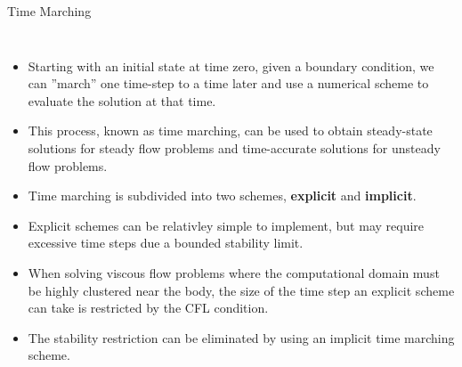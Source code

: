 \begin{frame}{Time Marching}
  \begin{columns}
    \begin{itemize}
      \item Starting with an initial state at time zero, given a boundary condition, we can 
            ”march” one time-step to a time later and use a numerical scheme to evaluate the 
            solution at that time.
      \item This process, known as time marching, can be used to obtain steady-state solutions 
            for steady flow problems and time-accurate solutions for unsteady flow problems.
      \item Time marching is subdivided into two schemes, \textbf{explicit} and \textbf{implicit}.
      \item Explicit schemes can be relativley simple to implement, but may require excessive 
            time steps due a bounded stability limit.
      \item When solving viscous flow problems where the computational domain must be highly 
            clustered near the body, the size of the time step an explicit scheme can take is 
            restricted by the CFL condition. 
      \item The stability restriction can be eliminated by using an implicit time marching scheme.
    \end{itemize}   
  \end{columns}
\end{frame}

